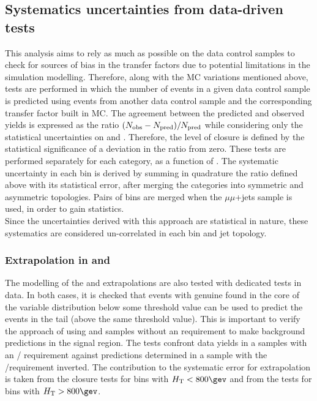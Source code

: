 \subsection{Systematics uncertainties from data-driven tests}
\label{sec:closure-tests}
This analysis aims to rely as much as possible on the data control samples
to check for sources of bias in the transfer factors due to potential limitations in
the simulation modelling. 
Therefore, along with the MC variations mentioned above, tests are performed 
in which the number of events in a given data control sample is predicted 
using events from another data control sample and the corresponding transfer factor built in MC. 
The agreement between the predicted and observed yields is
expressed as the ratio $(N_{\textrm{obs}} - N_{\textrm{pred}})/N_{\textrm{pred}}$ while considering only
the statistical uncertainties on \npre and \nobs. Therefore, the level
of closure is defined by the statistical significance of a deviation
in the ratio from zero.
These tests are performed separately for each \njet category, as a function of \scalht. 
The systematic uncertainty in each \scalht bin is derived by summing in quadrature the ratio 
defined above with its statistical error, after merging the \njet categories into symmetric and asymmetric topologies. 
Pairs of \scalht bins are merged when the $\mu\mu$+jets sample is used, in order to gain statistics. \\
Since the uncertainties derived with this approach are statistical in nature, 
these systematics are considered un-correlated in each \scalht bin and jet topology. 


\subsubsection*{Extrapolation in \alphat and \bdphi}
\label{sec:tfSyst_alphaT}
The modelling of the \alphat and
\bdphi extrapolations are also tested with dedicated tests in data. 
In both cases, it is checked that events with genuine \met found in the core
of the variable distribution below some threshold value can be used to
predict the events in the tail (above the same threshold value).
This is important to verify the
approach of using \mj and \mmj samples without an \alphat requirement
to make background predictions in the signal region. The tests
confront data yields in a \mj  samples with an \alphat /\bdphi
requirement against predictions determined in a \mj sample with
the \alphat /\bdphi requirement inverted. 
The contribution to the systematic error for \met extrapolation is taken
from the \alphat closure tests for bins with $\scalht<800\gev$ and from 
the \bdphi tests for bins with $\scalht>800\gev$. 

